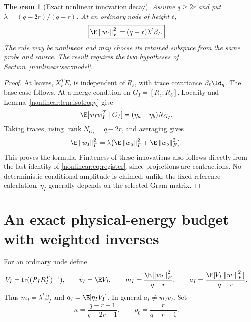 \documentclass[11pt,oneside,openany,a4paper]{book}
\numberwithin{equation}{chapter}
\newtheorem{theorem}{Theorem}[chapter]
\theoremstyle{definition}
\theoremstyle{remark}
\newcommand{\F}[1]{\left\lVert#1\right\rVert_F}
\DeclareMathOperator{\tr}{tr}\DeclareMathOperator{\rank}{rank}
\begin{document}
\begin{theorem}[Exact nonlinear innovation decay]\label{nonlinear:thm:innovation}
Assume $q\ge2r$ and put $\lambda=(q-2r)/(q-r)$. At an ordinary node of height $t$,
\begin{equation}\label{nonlinear:eq:innovation}
 \boxed{\E\F{w_I}^2=(q-r)\lambda^t\beta_I.}
\end{equation}
The rule may be nonlinear and may choose its retained subspace from the same probe and source. The result requires the two hypotheses of Section~\ref{nonlinear:sec:model}.
\end{theorem}
\begin{proof}
At leaves, $X_\ell^TE_\ell$ is independent of $R_\ell$, with trace covariance $\beta_\ell\Id_q$. The base case follows. At a merge condition on $G_I=[R_a;R_b]$. Locality and Lemma~\ref{nonlinear:lem:isotropy} give
\[
 \E[w_Iw_I^T\mid G_I]
   =(\eta_a+\eta_b)N_{G_I}.
\]
Taking traces, using $\rank N_{G_I}=q-2r$, and averaging gives
\[
 \E\F{w_I}^2=\lambda\bigl(\E\F{w_a}^2+\E\F{w_b}^2\bigr).
\]
This proves the formula. Finiteness of these innovations also follows directly from the last identity of \eqref{nonlinear:eq:register}, since projections are contractions. No deterministic conditional amplitude is claimed: unlike the fixed-reference calculation, $\eta_I$ generally depends on the selected Gram matrix.
\end{proof}

\section{An exact physical-energy budget with weighted inverses}\label{nonlinear:sec:energy}
For an ordinary node define
\begin{equation}\label{nonlinear:eq:scalars}
 V_I=\tr((R_IR_I^T)^{-1}),\qquad v_I=\E V_I,\qquad
 m_I=\frac{\E\F{w_I}^2}{q-r},\qquad
 a_I=\frac{\E[V_I\F{w_I}^2]}{q-r}.
\end{equation}
Thus $m_I=\lambda^t\beta_I$ and $a_I=\E[\eta_I V_I]$. In general $a_I\ne m_Iv_I$.
Set
\[
 \kappa=\frac{q-r-1}{q-2r-1},\qquad \rho_0=\frac{r}{q-r-1}.
\]
\end{document}
